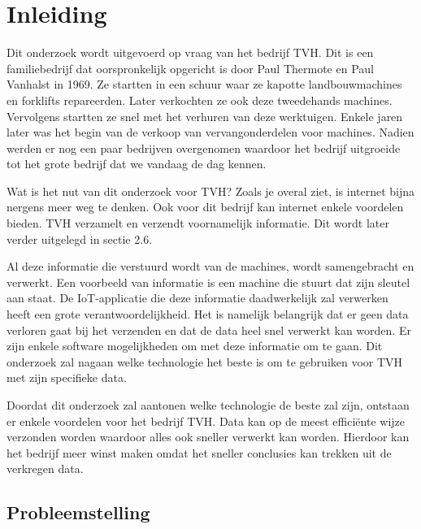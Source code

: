
\chapter{Inleiding}
\label{ch:inleiding}

Dit onderzoek wordt uitgevoerd op vraag van het bedrijf TVH. Dit is een familiebedrijf dat oorspronkelijk opgericht is door Paul Thermote en Paul Vanhalst in 1969. Ze startten in een schuur waar ze kapotte landbouwmachines en forklifts repareerden. Later verkochten ze ook deze tweedehands machines. Vervolgens startten ze snel met het verhuren van deze werktuigen. Enkele jaren later was het begin van de verkoop van vervangonderdelen voor machines. Nadien werden er nog een paar bedrijven overgenomen waardoor het bedrijf uitgroeide tot het grote bedrijf dat we vandaag de dag kennen. 

Wat is het nut van dit onderzoek voor TVH? Zoals je overal ziet, is internet bijna nergens meer weg te denken. Ook voor dit bedrijf kan internet enkele voordelen bieden. TVH verzamelt en verzendt voornamelijk informatie. Dit wordt later verder uitgelegd in sectie 2.6.

Al deze informatie die verstuurd wordt van de machines, wordt samengebracht en verwerkt. Een voorbeeld van informatie is een machine die stuurt dat zijn sleutel aan staat. De IoT-applicatie die deze informatie daadwerkelijk zal verwerken heeft een grote verantwoordelijkheid. Het is namelijk belangrijk dat er geen data verloren gaat bij het verzenden en dat de data heel snel verwerkt kan worden. Er zijn enkele software mogelijkheden om met deze informatie om te gaan. Dit onderzoek zal nagaan welke technologie het beste is om te gebruiken voor TVH met zijn specifieke data.

Doordat dit onderzoek zal aantonen welke technologie de beste zal zijn, ontstaan er enkele voordelen voor het bedrijf TVH. Data kan op de meest efficiënte wijze verzonden worden waardoor alles ook sneller verwerkt kan worden. Hierdoor kan het bedrijf meer winst maken omdat het sneller conclusies kan trekken uit de verkregen data. 




\section{Probleemstelling}
\label{sec:probleemstelling}

